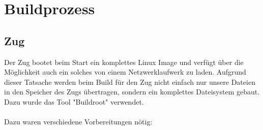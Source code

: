 \chapter{Buildprozess}

\section{Zug}

Der Zug bootet beim Start ein komplettes Linux Image und verfügt über die Möglichkeit auch ein solches von einem Netzwerklaufwerk zu laden. Aufgrund dieser Tatsache werden beim Build für den Zug nicht einfach nur unsere Dateien in den Speicher des Zugs übertragen, sondern ein komplettes Dateisystem gebaut. Dazu wurde das Tool "Buildroot" verwendet. \\\\
Dazu waren verschiedene Vorbereitungen nötig:

